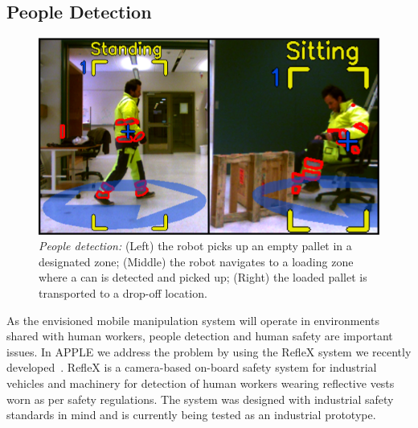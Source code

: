 \subsection{People Detection}
\label{subsec:people_det}
%
\begin{figure}[t!]
  \begin{center}
    \includegraphics[width =1\linewidth]{figs/person_detection}
    \caption{\textit{People detection:} (Left) the robot picks up an empty pallet in a designated
      zone; (Middle) the robot navigates to a loading zone where a can is detected and picked up;
      (Right) the loaded pallet is transported to a drop-off location.}
    \label{fig:people_det}
    \vspace{-0.5cm}
  \end{center}
\end{figure}
% 
As the envisioned mobile manipulation system will operate in environments shared with human workers,
people detection and human safety are important issues. In APPLE we address the problem by using the
RefleX system we recently developed~\cite{Mosb14}. RefleX is a camera-based on-board safety system
for industrial vehicles and machinery for detection of human workers wearing reflective vests worn
as per safety regulations. The system was designed with industrial safety standards in mind and is
currently being tested as an industrial prototype.
%
